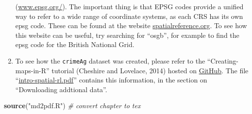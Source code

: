 \documentclass[]{article}
\newenvironment{Shaded}{}{}
\newcommand{\KeywordTok}[1]{\textcolor[rgb]{0.00,0.44,0.13}{\textbf{{#1}}}}
\newcommand{\StringTok}[1]{\textcolor[rgb]{0.25,0.44,0.63}{{#1}}}
\newcommand{\CommentTok}[1]{\textcolor[rgb]{0.38,0.63,0.69}{\textit{{#1}}}}
\newcommand{\NormalTok}[1]{{#1}}
\begin{document}
\begin{enumerate}[1.]
  (\href{http://www.epsg.org/}{www.epsg.org/}). The important thing is
  that EPSG codes provide a unified way to refer to a wide range of
  coordinate systems, as each CRS has its own epsg code. These can be
  found at the website
  \href{http://spatialreference.org/}{spatialreference.org}. To see how
  this website can be useful, try searching for ``osgb'', for example to
  find the epsg code for the British National Grid.
\item
  To see how the \texttt{crimeAg} dataset was created, please refer to
  the ``Creating-maps-in-R'' tutorial (Cheshire and Lovelace, 2014)
  hosted on
  \href{https://github.com/Robinlovelace/Creating-maps-in-R}{GitHub}.
  The file
  ``\href{https://github.com/Robinlovelace/Creating-maps-in-R/blob/master/intro-spatial-rl.pdf}{intro-spatial-rl.pdf}''
  contains this information, in the section on ``Downloading addtional
  data''.
\end{enumerate}

\begin{Shaded}
\begin{Highlighting}[]
\KeywordTok{source}\NormalTok{(}\StringTok{"md2pdf.R"}\NormalTok{)  }\CommentTok{# convert chapter to tex}
\end{Highlighting}
\end{Shaded}
\end{document}
